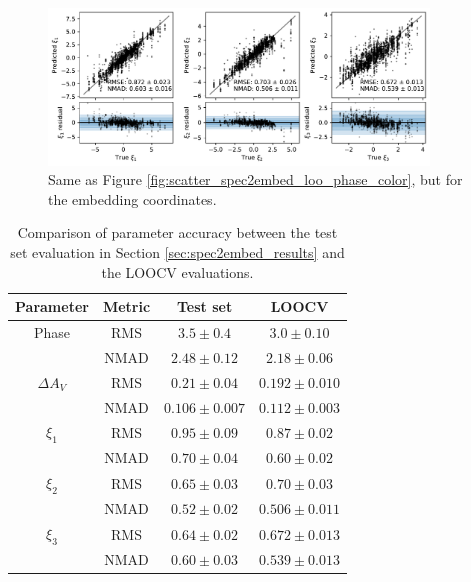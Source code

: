 \begin{figure}
    \centering
    \includegraphics[width=0.9\textwidth]{figures/nn_twins/scatter_loo_spec2embed_coords.pdf}
    \caption{Same as Figure \ref{fig:scatter_spec2embed_loo_phase_color}, but for the embedding coordinates.}
    \label{fig:scatter_spec2embed_loo_coords}
\end{figure}

\begin{table}[htbp]
    \centering
    \begin{tabular}{cccc}\toprule
        Parameter & Metric & Test set & LOOCV \\\midrule
        Phase & RMS & $3.5 \pm 0.4$ & $3.0 \pm 0.10$ \\
        & NMAD & $2.48 \pm 0.12$ & $2.18 \pm 0.06$\\
        $\Delta A_V$ & RMS & $0.21 \pm 0.04$ & $0.192 \pm 0.010$ \\
        & NMAD & $0.106 \pm 0.007$ & $0.112 \pm 0.003$\\
        $\xi_1$ & RMS & $0.95 \pm 0.09$ & $0.87 \pm 0.02$ \\
        & NMAD & $0.70 \pm 0.04$ & $0.60 \pm 0.02$\\
        $\xi_2$ & RMS & $0.65 \pm 0.03$ & $0.70 \pm 0.03$ \\
        & NMAD & $0.52 \pm 0.02$ & $0.506 \pm 0.011$\\
        $\xi_3$ & RMS & $0.64 \pm 0.02$ & $0.672 \pm 0.013$ \\
        & NMAD & $0.60 \pm 0.03$ & $0.539 \pm 0.013$\\
        \bottomrule
    \end{tabular}
    \caption{Comparison of parameter accuracy between the test set evaluation in Section \ref{sec:spec2embed_results} and the LOOCV evaluations.}
    \label{tab:loocv_comparison}
\end{table}


